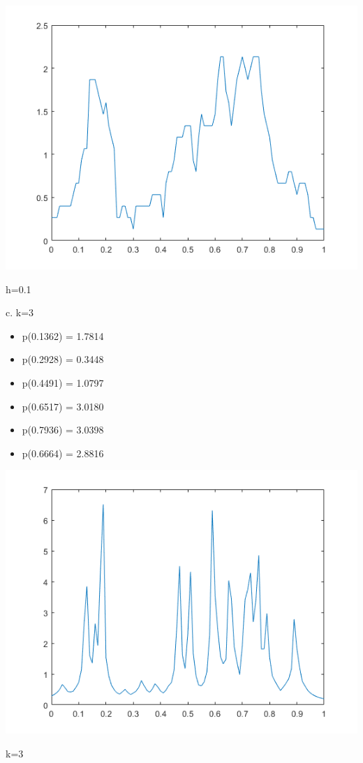 \documentclass[a4paper]{article}
\begin{document}
\begin{center}
    \includegraphics[scale=1]{3b.png}
    \caption{h=0.1}
\end{center}

c. 
k=3
\begin{itemize}
    \item p(0.1362) = 1.7814
    \item p(0.2928) = 0.3448
    \item p(0.4491) = 1.0797
    \item p(0.6517) = 3.0180
    \item p(0.7936) = 3.0398
    \item p(0.6664) = 2.8816
\end{itemize}

\begin{center}
    \includegraphics[scale=1]{3-3a.png}
    \caption{k=3}
\end{center}
\end{document}
